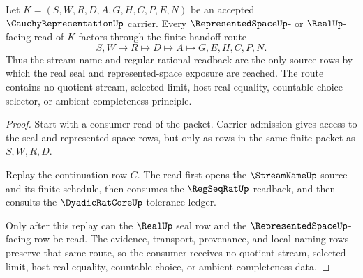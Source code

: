\begin{theorem}
\label{thm:cauchy-representation-streamname-regseqrat-handoff}
Let $K=(S,W,R,D,A,G,H,C,P,E,N)$ be an accepted $\CauchyRepresentationUp$ carrier. Every $\RepresentedSpaceUp$- or $\RealUp$-facing read of $K$ factors through the finite handoff route
$$
S,W \longmapsto R \longmapsto D \longmapsto A \longmapsto G,E,H,C,P,N .
$$
Thus the stream name and regular rational readback are the only source rows by which the real seal and represented-space exposure are reached. The route contains no quotient stream, selected limit, host real equality, countable-choice selector, or ambient completeness principle.
\end{theorem}
\begin{proof}
Start with a consumer read of the packet. Carrier admission gives access to the seal and represented-space rows, but only as rows in the same finite packet as $S,W,R,D$.

Replay the continuation row $C$. The read first opens the $\StreamNameUp$ source and its finite schedule, then consumes the $\RegSeqRatUp$ readback, and then consults the $\DyadicRatCoreUp$ tolerance ledger.

Only after this replay can the $\RealUp$ seal row and the $\RepresentedSpaceUp$-facing row be read. The evidence, transport, provenance, and local naming rows preserve that same route, so the consumer receives no quotient stream, selected limit, host real equality, countable choice, or ambient completeness data.
\end{proof}

\begin{closurestatus}{\CauchyRepresentationUp}
  \theoryclosure{\seedClosure}
  \formalstatus{\theoremCheckedV}
\end{closurestatus}
